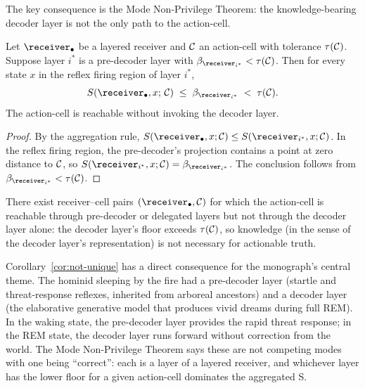 The key consequence is the Mode Non-Privilege Theorem: the knowledge-bearing decoder layer is not the only path to the action-cell.

\begin{theorem}\label{thm:mode-nonpriv}
Let $\receiver_\bullet$ be a layered receiver and $\mathcal{C}$ an action-cell with tolerance $\tau(\mathcal{C})$. Suppose layer $i^*$ is a pre-decoder layer with $\NoiseFloor_{\receiver_{i^*}} < \tau(\Cell)$. Then for every state $x$ in the reflex firing region of layer $i^*$,
\[
S(\receiver_\bullet, x;\, \Cell) \;\leq\; \NoiseFloor_{\receiver_{i^*}} \;<\; \tau(\Cell).
\]
The action-cell is reachable without invoking the decoder layer.
\end{theorem}

\begin{proof}
By the aggregation rule, $S(\receiver_\bullet, x; \Cell) \leq S(\receiver_{i^*}, x; \Cell)$. In the reflex firing region, the pre-decoder's projection contains a point at zero distance to $\mathcal{C}$, so $S(\receiver_{i^*}, x; \Cell) = \NoiseFloor_{\receiver_{i^*}}$. The conclusion follows from $\NoiseFloor_{\receiver_{i^*}} < \tau(\Cell)$.
\end{proof}

\begin{corollary}\label{cor:not-unique}
There exist receiver--cell pairs $(\receiver_\bullet, \Cell)$ for which the action-cell is reachable through pre-decoder or delegated layers but not through the decoder layer alone: the decoder layer's floor exceeds $\tau(\mathcal{C})$, so knowledge (in the sense of the decoder layer's representation) is not necessary for actionable truth.
\end{corollary}

Corollary~\ref{cor:not-unique} has a direct consequence for the monograph's central theme. The hominid sleeping by the fire had a pre-decoder layer (startle and threat-response reflexes, inherited from arboreal ancestors) and a decoder layer (the elaborative generative model that produces vivid dreams during full REM). In the waking state, the pre-decoder layer provides the rapid threat response; in the REM state, the decoder layer runs forward without correction from the world. The Mode Non-Privilege Theorem says these are not competing modes with one being ``correct'': each is a layer of a layered receiver, and whichever layer has the lower floor for a given action-cell dominates the aggregated S.

